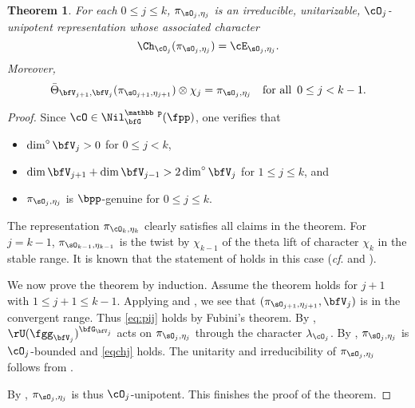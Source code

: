 \documentclass[12pt,a4paper]{amsart}
\numberwithin{equation}{section}
\newtheorem{thm}{Theorem}[section]
\theoremstyle{remark}
\def\dimo{\dim^\circ}
\def\Thetab{\bar{\Theta}}
\begin{document}
\begin{thm}\label{thmunip} For each $0\leq j\leq k$,  $\pi_{\sO_j, \eta_j}$ is  an
 irreducible, unitarizable,
  $\cO_j$-unipotent representation whose associated character
  \begin{equation}\label{eqchj}
    \Ch_{\cO_j}( \pi_{\sO_j, \eta_j})  = \cE_{\sO_j, \eta_j}.
          \end{equation}
  Moreover,
  \begin{equation}
    \Thetab_{\bfV_{j+1}, \bfV_{j}}(\pi_{\sO_{j+1},
      \eta_{j+1}})\otimes \chi_{j} =\pi_{\sO_{j},\eta_{j}} \quad\textrm{for all }\, 0\leq
    j<k-1. \label{eq:pij}
  \end{equation}
\end{thm}
\begin{proof}
  Since $\cO\in \Nil^{\mathbb p}_{\bfG}(\fpp)$, one verifies that
  \begin{itemize}
  \item $\dimo \bfV_j>0$ for $0 \leq j< k$,
  \item $\dim \bfV_{j+1}+ \dim \bfV_{j-1} > 2 \dimo \bfV_j$ for
    $1\leq j \leq k$, and
  \item
    $\pi_{\sO_j, \eta_j}$ is  $\bpp$-genuine for $0\leq j\leq k$.
      \end{itemize}
  The representation $\pi_{\cO_k,\eta_k}$ clearly satisfies all claims in the
  theorem.  %
  For $j = k-1$,  $\pi_{\sO_{k-1},\eta_{k-1}}$ is the twist by $\chi_{k-1}$ of
  the theta lift of character $\chi_k$ in the stable range.
  It is known that the statement of  holds in this case (\emph{cf}. \cite[Section~2]{Li89} and \cite[Section~1.8]{LM}).

  We now prove the theorem by induction. Assume the theorem holds for
  $j+1$ with $1\leq j+1\leq k-1$.
   Applying  and , we see that
  $(\pi_{\sO_{j+1}, \eta_{j+1}}, \bfV_{j})$ is in the convergent range. Thus  %
  \cref{eq:pij} holds by Fubini's theorem.  By \cite[Theorem 1.19]{PrzInf},
  $\rU(\fgg_{\bfV_j})^{\bfG_{\bfV_j}} $ acts on $\pi_{\sO_{j}, \eta_{j}}$
  through the character $\lambda_{\cO_j}$.  By ,
  $\pi_{\sO_{j}, \eta_{j}}$ is $\cO_{j}$-bounded and \cref{eqchj} holds.  The
  unitarity and irreducibility of $\pi_{\sO_{j}, \eta_{j}}$ follows from
  .

  By , $\pi_{\sO_j,\eta_j}$ is thus $\cO_j$-unipotent. This
  finishes the proof of the theorem.
\end{proof}
\end{document}
